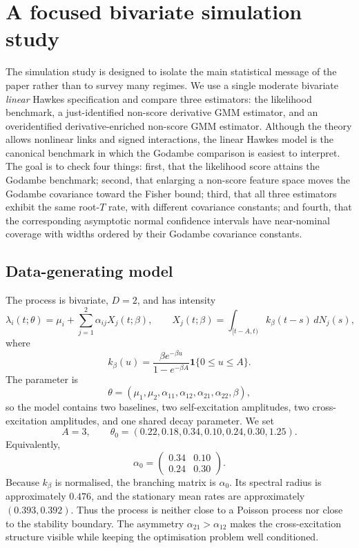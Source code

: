 \section{A focused bivariate simulation study}\label{sec:simulation-focused-bivariate}

The simulation study is designed to isolate the main statistical message of the paper rather than to survey many regimes.  We use a single moderate bivariate \emph{linear} Hawkes specification and compare three estimators: the likelihood benchmark, a just-identified non-score derivative GMM estimator, and an overidentified derivative-enriched non-score GMM estimator.  Although the theory allows nonlinear links and signed interactions, the linear Hawkes model is the canonical benchmark in which the Godambe comparison is easiest to interpret.  The goal is to check four things: first, that the likelihood score attains the Godambe benchmark; second, that enlarging a non-score feature space moves the Godambe covariance toward the Fisher bound; third, that all three estimators exhibit the same root-$T$ rate, with different covariance constants; and fourth, that the corresponding asymptotic normal confidence intervals have near-nominal coverage with widths ordered by their Godambe covariance constants.

\subsection{Data-generating model}

The process is bivariate, $D=2$, and has intensity
\[
    \lambda_i(t;\theta)
    =
    \mu_i+
    \sum_{j=1}^2\alpha_{ij}X_j(t;\beta),
    \qquad
    X_j(t;\beta)=\int_{[t-A,t)}k_\beta(t-s)\,dN_j(s),
\]
where
\[
    k_\beta(u)
    =
    \frac{\beta e^{-\beta u}}{1-e^{-\beta A}}\mathbf 1\{0\le u\le A\}.
\]
The parameter is
\[
    \theta=(\mu_1,\mu_2,\alpha_{11},\alpha_{12},\alpha_{21},\alpha_{22},\beta),
\]
so the model contains two baselines, two self-excitation amplitudes, two cross-excitation amplitudes, and one shared decay parameter.  We set
\[
    A=3,
    \qquad
    \theta_0=(0.22,0.18,0.34,0.10,0.24,0.30,1.25).
\]
Equivalently,
\[
    \alpha_0=
    \begin{pmatrix}
        0.34 & 0.10\\
        0.24 & 0.30
    \end{pmatrix}.
\]
Because $k_\beta$ is normalised, the branching matrix is $\alpha_0$.  Its spectral radius is approximately $0.476$, and the stationary mean rates are approximately $(0.393,0.392)$.  Thus the process is neither close to a Poisson process nor close to the stability boundary.  The asymmetry $\alpha_{21}>\alpha_{12}$ makes the cross-excitation structure visible while keeping the optimisation problem well conditioned.

